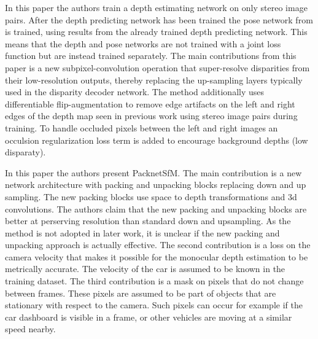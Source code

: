 In this paper\cite{superdepth} the authors train a depth estimating network on only stereo image pairs. After the depth predicting network has been trained the pose network from \cite{sfmlearner} is trained, using results from the already trained depth predicting network. This means that the depth and pose networks are not trained with a joint loss function but are instead trained separately. The main contributions from this paper is a new subpixel-convolution operation that super-resolve disparities from their low-resolution outputs, thereby replacing the up-sampling layers typically used in the disparity decoder network. The method additionally uses differentiable flip-augmentation to remove edge artifacts on the left and right edges of the depth map seen in previous work using stereo image pairs during training. To handle occluded pixels between the left and right images an occulsion regularization loss term is added to encourage background depths (low disparaty).


In this paper\cite{packnet} the authors present PacknetSfM. The main contribution is a new network architecture with packing and unpacking blocks replacing down and up sampling. The new packing blocks use space to depth transformations and 3d convolutions. The authors claim that the new packing and unpacking blocks are better at perserving resolution than standard down and upsampling. As the method is not adopted in later work, it is unclear if the new packing and unpacking approach is actually effective. The second contribution is a loss on the camera velocity that makes it possible for the monocular depth estimation to be metrically accurate. The velocity of the car is assumed to be known in the training dataset. The third contribution is a mask on pixels that do not change between frames. These pixels are assumed to be part of objects that are stationary with respect to the camera. Such pixels can occur for example if the car dashboard is visible in a frame, or other vehicles are moving at a similar speed nearby.


